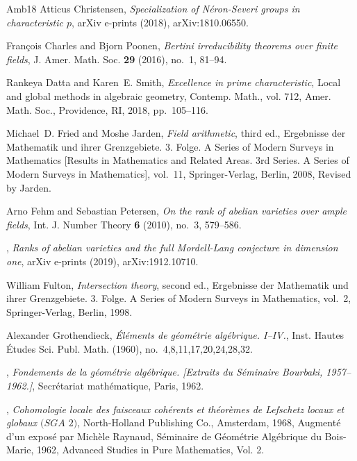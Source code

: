 \documentclass{amsart}
\theoremstyle{definition}
\theoremstyle{remark}
\let \cedilla =\c
\renewcommand{\c}[0]{{\mathbb C}}
\begin{document}
\begin{thebibliography}{{Amb}18}
Atticus {Christensen}, \emph{{Specialization of N{\'e}ron-Severi groups in
  characteristic $p$}}, arXiv e-prints (2018), arXiv:1810.06550.

Fran\cedilla{c}ois Charles and Bjorn Poonen, \emph{Bertini irreducibility
  theorems over finite fields}, J. Amer. Math. Soc. \textbf{29} (2016), no.~1,
  81--94. 

Rankeya Datta and Karen~E. Smith, \emph{Excellence in prime characteristic},
  Local and global methods in algebraic geometry, Contemp. Math., vol. 712,
  Amer. Math. Soc., Providence, RI, 2018, pp.~105--116. 

Michael~D. Fried and Moshe Jarden, \emph{Field arithmetic}, third ed.,
  Ergebnisse der Mathematik und ihrer Grenzgebiete. 3. Folge. A Series of
  Modern Surveys in Mathematics [Results in Mathematics and Related Areas. 3rd
  Series. A Series of Modern Surveys in Mathematics], vol.~11, Springer-Verlag,
  Berlin, 2008, Revised by Jarden. 

Arno Fehm and Sebastian Petersen, \emph{On the rank of abelian varieties over
  ample fields}, Int. J. Number Theory \textbf{6} (2010), no.~3, 579--586.

\bysame, \emph{{Ranks of abelian varieties and the full Mordell-Lang conjecture
  in dimension one}}, arXiv e-prints (2019), arXiv:1912.10710.

William Fulton, \emph{Intersection theory}, second ed., Ergebnisse der
  Mathematik und ihrer Grenzgebiete. 3. Folge. A Series of Modern Surveys in
  Mathematics, vol.~2, Springer-Verlag, Berlin, 1998. 

Alexander Grothendieck, \emph{\'{E}l\'ements de g\'eom\'etrie alg\'ebrique.
  {I--IV}.}, Inst. Hautes \'Etudes Sci. Publ. Math. (1960),
  no.~4,8,11,17,20,24,28,32.

\bysame, \emph{Fondements de la g\'eom\'etrie alg\'ebrique. [{E}xtraits du
  {S}\'eminaire {B}ourbaki, 1957--1962.]}, Secr\'etariat math\'ematique, Paris,
  1962. 

\bysame, \emph{Cohomologie locale des faisceaux coh\'erents et th\'eor\`emes de
  {L}efschetz locaux et globaux {$(SGA$} {$2)$}}, North-Holland Publishing Co.,
  Amsterdam, 1968, Augment\'e d'un expos\'e par Mich\`ele Raynaud, S\'eminaire
  de G\'eom\'etrie Alg\'ebrique du Bois-Marie, 1962, Advanced Studies in Pure
  Mathematics, Vol. 2. 


\end{thebibliography}
\end{document}

